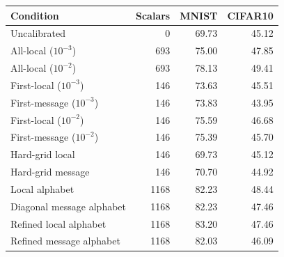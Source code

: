 \begin{tabular}{lrrr}
\toprule
Condition & Scalars & MNIST & CIFAR10 \\
\midrule
Uncalibrated & 0 & 69.73 & 45.12 \\
All-local ($10^{-3}$) & 693 & 75.00 & 47.85 \\
All-local ($10^{-2}$) & 693 & 78.13 & 49.41 \\
First-local ($10^{-3}$) & 146 & 73.63 & 45.51 \\
First-message ($10^{-3}$) & 146 & 73.83 & 43.95 \\
First-local ($10^{-2}$) & 146 & 75.59 & 46.68 \\
First-message ($10^{-2}$) & 146 & 75.39 & 45.70 \\
Hard-grid local & 146 & 69.73 & 45.12 \\
Hard-grid message & 146 & 70.70 & 44.92 \\
Local alphabet & 1168 & 82.23 & 48.44 \\
Diagonal message alphabet & 1168 & 82.23 & 47.46 \\
Refined local alphabet & 1168 & 83.20 & 47.46 \\
Refined message alphabet & 1168 & 82.03 & 46.09 \\
\bottomrule
\end{tabular}
